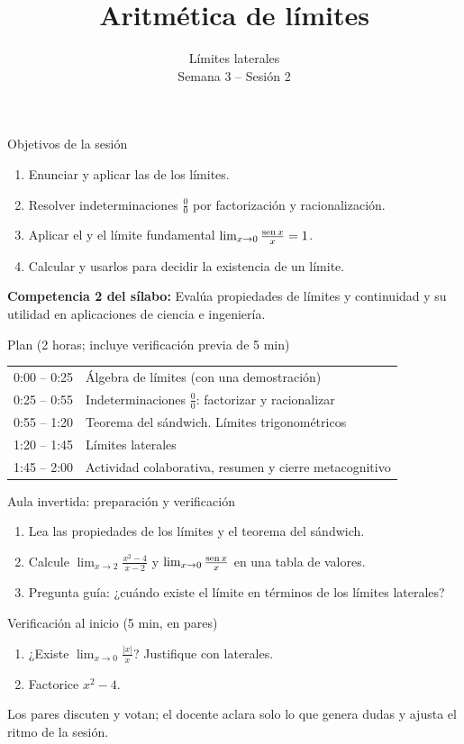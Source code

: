 \documentclass[10pt,aspectratio=169]{beamer}
\title[Aritmética de límites]{Aritmética de límites}
\subtitle{Límites laterales\\[2pt]\small Semana 3 -- Sesión 2}
\begin{document}
\begin{frame}
  \titlepage
\end{frame}

\begin{frame}{Objetivos de la sesión}
  \begin{enumerate}
    \item Enunciar y aplicar las  de los límites.
    \item Resolver indeterminaciones $\frac00$ por factorización y racionalización.
    \item Aplicar el  y el límite fundamental $\lim_{x\to0}\frac{\operatorname{sen} x}{x}=1$.
    \item Calcular  y usarlos para decidir la existencia de un límite.
  \end{enumerate}
  \vspace{1mm}
  {\small\textbf{Competencia 2 del sílabo:} Evalúa propiedades de límites y continuidad y su utilidad en aplicaciones de ciencia e ingeniería.}
  \begin{block}{Plan (2 horas; incluye verificación previa de 5 min)}
    \begin{tabular}{ll}
      0:00 -- 0:25 & Álgebra de límites (con una demostración)\\
      0:25 -- 0:55 & Indeterminaciones $\frac00$: factorizar y racionalizar\\
      0:55 -- 1:20 & Teorema del sándwich. Límites trigonométricos\\
      1:20 -- 1:45 & Límites laterales\\
      1:45 -- 2:00 & Actividad colaborativa, resumen y cierre metacognitivo
    \end{tabular}
  \end{block}
\end{frame}

\begin{frame}{Aula invertida: preparación y verificación}
  \small
  \begin{previa}
    \begin{enumerate}
      \item Lea las propiedades de los límites y el teorema del sándwich.
      \item Calcule $\lim_{x\to2}\frac{x^2-4}{x-2}$ y $\lim_{x\to0}\frac{\operatorname{sen} x}{x}$ en una tabla de valores.
      \item Pregunta guía: ¿cuándo existe el límite en términos de los límites laterales?
    \end{enumerate}
  \end{previa}
  \begin{block}{Verificación al inicio (5 min, en pares)}
    \begin{enumerate}
      \item ¿Existe $\lim_{x\to0}\frac{|x|}{x}$? Justifique con laterales.
      \item Factorice $x^2-4$.
    \end{enumerate}
    Los pares discuten y votan; el docente aclara solo lo que genera dudas y ajusta el ritmo de la sesión.
  \end{block}
\end{frame}
\end{document}
